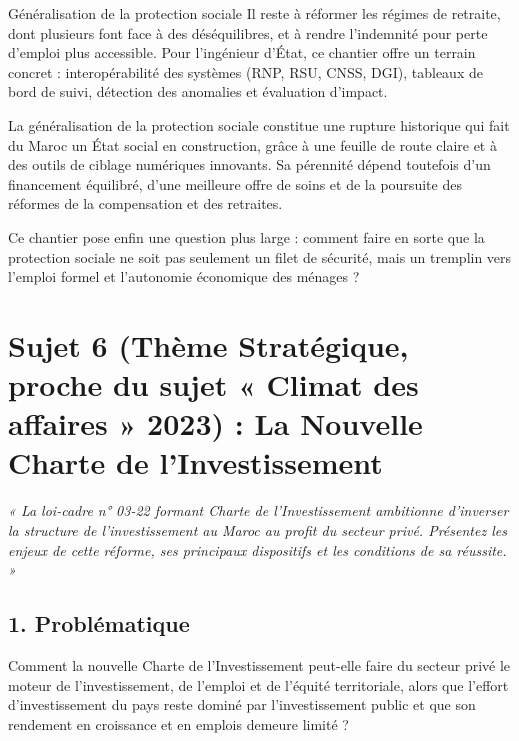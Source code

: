 \begin{copiemodele}{Généralisation de la protection sociale}
Il reste à réformer les régimes de retraite, dont plusieurs font face à des déséquilibres, et à rendre l'indemnité pour perte d'emploi plus accessible. Pour l'ingénieur d'État, ce chantier offre un terrain concret : interopérabilité des systèmes (RNP, RSU, CNSS, DGI), tableaux de bord de suivi, détection des anomalies et évaluation d'impact.

La généralisation de la protection sociale constitue une rupture historique qui fait du Maroc un État social en construction, grâce à une feuille de route claire et à des outils de ciblage numériques innovants. Sa pérennité dépend toutefois d'un financement équilibré, d'une meilleure offre de soins et de la poursuite des réformes de la compensation et des retraites.

Ce chantier pose enfin une question plus large : comment faire en sorte que la protection sociale ne soit pas seulement un filet de sécurité, mais un tremplin vers l'emploi formel et l'autonomie économique des ménages ?
\end{copiemodele}

\section{Sujet 6 (Thème Stratégique, proche du sujet « Climat des affaires » 2023) : La Nouvelle Charte de l'Investissement}

\begin{tcolorbox}[colback=blue!5!white,colframe=blue!75!black,title=\textbf{Thème Stratégique et Sujet Très Probable}]
\textit{« La loi-cadre n° 03-22 formant Charte de l'Investissement ambitionne d'inverser la structure de l'investissement au Maroc au profit du secteur privé. Présentez les enjeux de cette réforme, ses principaux dispositifs et les conditions de sa réussite. »}
\end{tcolorbox}

\subsection*{1. Problématique}
Comment la nouvelle Charte de l'Investissement peut-elle faire du secteur privé le moteur de l'investissement, de l'emploi et de l'équité territoriale, alors que l'effort d'investissement du pays reste dominé par l'investissement public et que son rendement en croissance et en emplois demeure limité ?

